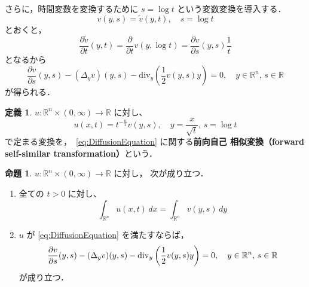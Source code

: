 \documentclass[paper=a4,
fontsize=12pt,
reqno,
uplatex,
dvipdfmx]{jlreq}
\theoremstyle{definition} %
\newtheorem{proposition}[theorem]{命題}
\newtheorem*{definition}{定義}
\begin{document}
さらに，時間変数を変換するために $s = \log t$ という変数変換を導入する．
\begin{equation}
 v(y, s)
  =
  \tilde{v}(y, t), 
  \quad s = \log t
\end{equation}
とおくと，
\begin{equation}
 \frac{\partial \tilde{v}}{\partial t}(y, t)
  =
  \frac{\partial}{\partial t} v(y, \log t)
  = 
  \frac{\partial v}{\partial s}(y, s) \frac{1}{t}
\end{equation}
となるから
\begin{equation}
 \frac{\partial v}{\partial s}(y, s)
  -
   (\Delta_y v)(y, s)
   - 
   \text{div}_y 
   \left(
    \frac{1}{2} v(y, s) y
   \right)
   =
   0, \quad y \in \mathbb{R}^n, \, s \in \mathbb{R}
\end{equation}
が得られる．

\begin{definition}
 $u: \mathbb{R}^n \times (0, \infty) \rightarrow \mathbb{R}$ に対し、
 \begin{equation}
  u(x, t)
   = 
   t^{-\frac{n}{2}}
   v(y, s), 
   \quad 
   y = \frac{x}{\sqrt{t}}, \, s = \log t
 \end{equation}
 で定まる変換を，~\eqref{eq:DiffusionEquation} に関する\textbf{前向自己
 相似変換（forward self-similar transformation）}という．
\end{definition}

\begin{proposition}
 $u: \mathbb{R}^n \times (0, \infty) \rightarrow \mathbb{R}$ に対し，
 次が成り立つ．
 \begin{enumerate}
  \item 全ての $t > 0$ に対し、
	\begin{equation}
	 \int_{\mathbb{R}^n} u(x, t) \, dx = \int_{\mathbb{R}^n} v(y, s) \, dy
	\end{equation}
  \item $u$ が \eqref{eq:DiffusionEquation} を満たすならば，
	\begin{equation}
	 \frac{\partial v}{\partial s}(y, s)
	  -
	  (\Delta_y v)(y, s)
	  -
	  \operatorname{div}_y
	  \left(
	   \frac{1}{2} v(y, s) y
	  \right)
	  =
	  0, 
	  \quad y \in \mathbb{R}^n, 
	  \, s \in \mathbb{R}
	\end{equation}
	が成り立つ．
 \end{enumerate}
\end{proposition}
\end{document}
